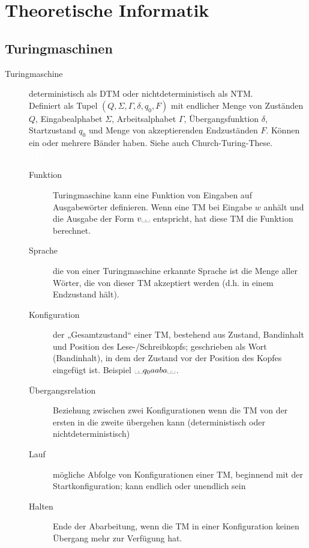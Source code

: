 \documentclass[a4paper,10pt]{article}
\newcommand{\vl}[1]{\colorbox{vl}{\textcolor{white}{\small\textbf{#1}}}}
\newcommand{\blank}{\text{\textvisiblespace}}
\begin{document}
    \newpage
    \section{Theoretische Informatik}
    \subsection{Turingmaschinen}
    \begin{description}
        \item[Turingmaschine] deterministisch als DTM oder nichtdeterministisch als NTM. \\
            Definiert als Tupel $(Q,\Sigma,\Gamma,\delta,q_0,F)$ mit endlicher Menge von Zuständen $Q$, Eingabealphabet $\Sigma$, Arbeitsalphabet $\Gamma$, Übergangsfunktion $\delta$, Startzustand $q_0$ und Menge von akzeptierenden Endzuständen $F$. Können ein oder mehrere Bänder haben. Siehe auch Church-Turing-These. \vl{FS 18} \vl{TIL 1}

            \begin{description}
                \item[Funktion] Turingmaschine kann eine Funktion von Eingaben auf Ausgabewörter definieren. Wenn eine TM bei Eingabe $w$ anhält und die Ausgabe der Form $v\blank\blank$ entspricht, hat diese TM die Funktion berechnet.
                \item[Sprache] die von einer Turingmaschine erkannte Sprache ist die Menge aller Wörter, die von dieser TM akzeptiert werden (d.h. in einem Endzustand hält).

                \item[Konfiguration]
                    der „Gesamtzustand“ einer TM, bestehend aus Zustand, Bandinhalt und Position des Lese-/Schreibkopfs;
                    geschrieben als Wort (Bandinhalt), in dem der Zustand vor der Position des Kopfes eingefügt ist. Beispiel $ \blank\blank q_0aaba \blank\blank$.
                \item[Übergangsrelation]
                    Beziehung zwischen zwei Konfigurationen wenn die TM von der ersten in die zweite übergehen kann
                    (deterministisch oder nichtdeterministisch)
                \item[Lauf] mögliche Abfolge von Konfigurationen einer TM, beginnend mit der Startkonfiguration; kann endlich oder unendlich sein
                \item[Halten] Ende der Abarbeitung, wenn die TM in einer Konfiguration keinen Übergang mehr zur Verfügung hat.


\end{description}
\end{description}
\end{document}
